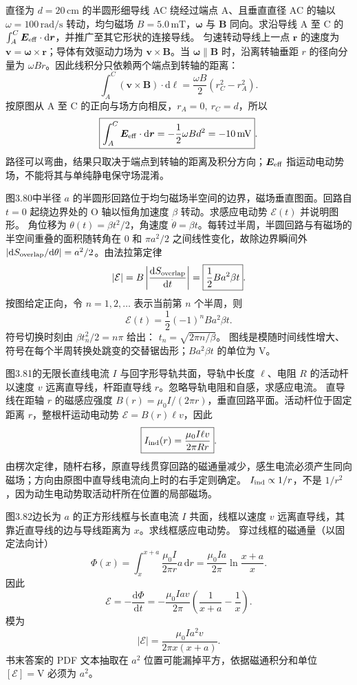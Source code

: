 直径为 $d=20\,\mathrm{cm}$ 的半圆形细导线 AC 绕经过端点 A、且垂直直径 AC 的轴以 $\omega=100\,\mathrm{rad/s}$ 转动，均匀磁场 $B=5.0\,\mathrm{mT}$，$\bm\omega$ 与 $\bm B$ 同向。求沿导线 A 至 C 的 $\int_A^C\bm E_{\rm eff}\cdot\mathrm d\bm r$，并推广至其它形状的连接导线。
\exsolution
匀速转动导线上一点 $\bm r$ 的速度为 $\bm v=\bm\omega\times\bm r$；导体有效驱动力场为 $\bm v\times\bm B$。当 $\bm\omega\parallel\bm B$ 时，沿离转轴垂距 $r$ 的径向分量为 $\omega Br$。因此线积分只依赖两个端点到转轴的距离：
\[
\int_A^C(\bm v\times\bm B)\cdot\mathrm d\bm\ell
=\frac{\omega B}{2}(r_C^2-r_A^2).
\]
按原图从 A 至 C 的正向与场方向相反，$r_A=0,\ r_C=d$，所以
\[
\boxed{\int_A^C\bm E_{\rm eff}\cdot\mathrm d\bm r
=-\frac12\omega Bd^2=-10\,\mathrm{mV}}.
\]
\excheck 路径可以弯曲，结果只取决于端点到转轴的距离及积分方向；$\bm E_{\rm eff}$ 指运动电动势场，不能将其与单纯静电保守场混淆。

图3.80中半径 $a$ 的半圆形回路位于均匀磁场半空间的边界，磁场垂直图面。回路自 $t=0$ 起绕边界处的 O 轴以恒角加速度 $\beta$ 转动。求感应电动势 $\mathcal E(t)$ 并说明图形。
\exsolution
角位移为 $\theta(t)=\beta t^2/2$，角速度 $\dot\theta=\beta t$。每转过半周，半圆回路与有磁场的半空间重叠的面积随转角在 $0$ 和 $\pi a^2/2$ 之间线性变化，故除边界瞬间外
$|\mathrm dS_{\rm overlap}/\mathrm d\theta|=a^2/2$。由法拉第定律
\[
|\mathcal E|=B\left|\frac{\mathrm dS_{\rm overlap}}{\mathrm dt}\right|
=\boxed{\frac12Ba^2\beta t}.
\]
按图给定正向，令 $n=1,2,\ldots$ 表示当前第 $n$ 个半周，则
\[
\boxed{\mathcal E(t)=\frac12(-1)^n Ba^2\beta t}.
\]
符号切换时刻由 $\beta t_n^2/2=n\pi$ 给出：
$\boxed{t_n=\sqrt{2\pi n/\beta}}$。
\excheck 图线是模随时间线性增大、符号在每个半周转换处跳变的交替锯齿形；$Ba^2\beta t$ 的单位为 V。

图3.81的无限长直线电流 $I$ 与回字形导轨共面，导轨中长度 $\ell$、电阻 $R$ 的活动杆以速度 $v$ 远离直导线，杆距直导线 $r$。忽略导轨电阻和自感，求感应电流。
\exsolution
直导线在距轴 $r$ 的磁感应强度
$B(r)=\mu_0I/(2\pi r)$，垂直回路平面。活动杆位于固定距离 $r$，整根杆运动电动势
$\mathcal E=B(r)\ell v$，因此
\[
\boxed{I_{\rm ind}(r)=\frac{\mu_0I\ell v}{2\pi Rr}}.
\]
由楞次定律，随杆右移，原直导线贯穿回路的磁通量减少，感生电流必须产生同向磁场；方向由原图中直导线电流向上时的右手定则确定。
\excheck $I_{\rm ind}\propto1/r$，不是 $1/r^2$，因为动生电动势取活动杆所在位置的局部磁场。

图3.82边长为 $a$ 的正方形线框与长直电流 $I$ 共面，线框以速度 $v$ 远离直导线，其靠近直导线的边与导线距离为 $x$。求线框感应电动势。
\exsolution
穿过线框的磁通量（以固定法向计）
\[
\Phi(x)=\int_x^{x+a}\frac{\mu_0I}{2\pi r}a\,\mathrm dr
=\frac{\mu_0Ia}{2\pi}\ln\frac{x+a}{x}.
\]
因此
\[
\mathcal E=-\frac{\mathrm d\Phi}{\mathrm dt}
=-\frac{\mu_0Iav}{2\pi}
\left(\frac1{x+a}-\frac1x\right).
\]
模为
\[
\boxed{|\mathcal E|=\frac{\mu_0Ia^2v}{2\pi x(x+a)}}.
\]
\excheck 书末答案的 PDF 文本抽取在 $a^2$ 位置可能漏掉平方，依据磁通积分和单位 $[\mathcal E]=\mathrm V$ 必须为 $a^2$。

